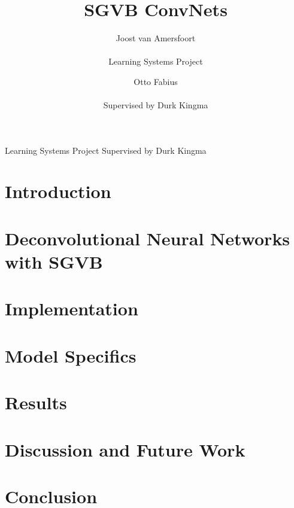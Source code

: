 \documentclass{article}
\title{SGVB ConvNets}
\author{Joost van Amersfoort \\ \\ Learning Systems Project \and Otto Fabius \\ \\ Supervised by Durk Kingma}
\begin{document}
\maketitle
\hspace{25mm} Learning Systems Project\hspace{20mm} Supervised by Durk Kingma
\tableofcontents
\newpage

\section{Introduction}


\section{Deconvolutional Neural Networks with SGVB}


\section{Implementation}\label{implementation}


\section{Model Specifics}\label{model_specs}


\section{Results}\label{results}


\section{Discussion and Future Work}\label{discussion}


\section{Conclusion}\label{conclusion}


\pagebreak 
\nocite{*}


\end{document}

